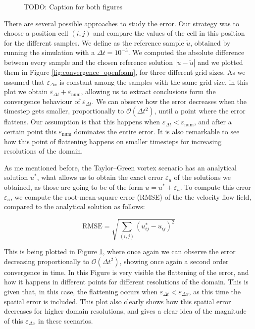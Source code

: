 \documentclass[
  english,        %
  font=times,     %
  onecolumn,      %
]{tumarticle}
\begin{document}
\begin{figure}[!htbp]
\begin{subfigure}[b]{0.49\textwidth}
      \caption{}
      \label{fig:RMSE_openfoam}
    \end{subfigure}
    \caption{TODO: Caption for both figures}
    \label{fig:figures}
  \end{figure}
  


There are several possible approaches to study the error. Our strategy was to choose a position cell $(i,j)$ and compare the values of the cell in this position for the different samples. We define as the reference sample $\tilde{u}$, obtained by running the simulation with a $\Delta t = 10^{-5}$. 
We computed the absolute difference between every sample and the chosen reference solution $|u - \tilde{u}|$ and we plotted them in Figure \ref{fig:convergence_openfoam}, for three different grid sizes. As we assumed that $\varepsilon_{\Delta x}$ is constant among the samples with the same grid size, in this plot we obtain $\varepsilon_{\Delta t} + \varepsilon_\text{num}$, allowing us to extract conclusions form the convergence behaviour of $\varepsilon_{\Delta t}$. We can observe how the error decreases when the timestep gets smaller, proportionally to $\mathcal{O}(\Delta t^2)$, until a point where the error flattens. Our assumption is that this happens when $\varepsilon_{\Delta t} < \varepsilon_\text{num}$, and after a certain point this $\varepsilon_\text{num}$ dominates the entire error. It is also remarkable to see how this point of flattening happens on smaller timesteps for increasing resolutions of the domain.

As me mentioned before, the Taylor–Green vortex scenario has an analytical solution $u^*$, what allows us to obtain the exact error $\varepsilon_{u}$ of the solutions we obtained, as those are going to be of the form $u = u^* + \varepsilon_{u}$. To compute this error $\varepsilon_{u}$, we compute the root-mean-square error (RMSE) of the the velocity flow field, compared to the analytical solution as follows:  

\begin{equation}
    \text{RMSE} = \sqrt{\sum_{(i,j)} (u^*_{ij} - u_{ij})^2 }
\end{equation}

This is being plotted in Figure \ref{fig:RMSE_openfoam}, where once again we can observe the error decreasing proportionally to $\mathcal{O}(\Delta t^2)$, showing once again a second order convergence in time. In this Figure is very visible the flattening of the error, and how it happens in different points for different resolutions of the domain. This is given that, in this case, the flattening occurs when $\varepsilon_{\Delta t} < \varepsilon_{\Delta x}$, as this time the spatial error is included. This plot also clearly shows how this spatial error decreases for higher domain resolutions, and gives a clear idea of the magnitude of this $\varepsilon_{\Delta x}$ in these scenarios. 
\end{document}
